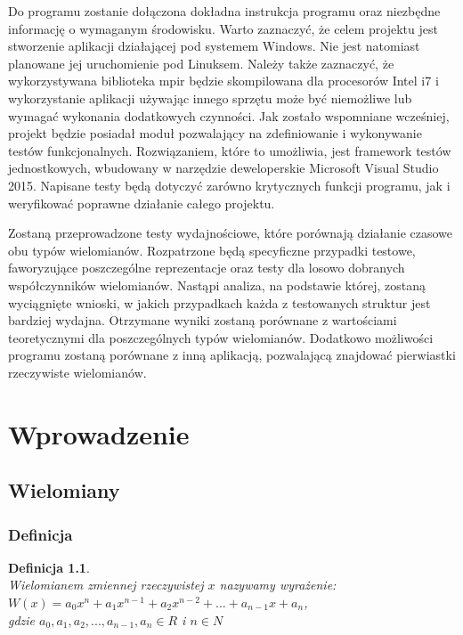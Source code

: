 \documentclass[oneside,a4paper]{book}
\newtheorem{definition}{Definicja}
\begin{document}
	Do programu zostanie dołączona dokładna instrukcja programu oraz niezbędne informację o wymaganym środowisku. Warto zaznaczyć, że celem projektu jest stworzenie aplikacji działającej pod systemem Windows. Nie jest natomiast planowane jej uruchomienie pod Linuksem. Należy także zaznaczyć, że wykorzystywana biblioteka mpir będzie skompilowana dla procesorów Intel i7 i wykorzystanie aplikacji używając innego sprzętu może być niemożliwe lub wymagać wykonania dodatkowych czynności.
	Jak zostało wspomniane wcześniej, projekt będzie posiadał moduł pozwalający na zdefiniowanie i wykonywanie testów funkcjonalnych. Rozwiązaniem, które to umożliwia, jest framework testów jednostkowych, wbudowany w narzędzie deweloperskie Microsoft Visual Studio 2015. Napisane testy będą dotyczyć zarówno krytycznych funkcji programu, jak i weryfikować poprawne działanie całego projektu.
	
	Zostaną przeprowadzone testy wydajnościowe, które porównają działanie czasowe obu typów wielomianów. Rozpatrzone będą specyficzne przypadki testowe, faworyzujące poszczególne reprezentacje oraz testy dla losowo dobranych współczynników wielomianów. Nastąpi analiza, na podstawie której, zostaną wyciągnięte wnioski, w jakich przypadkach każda z testowanych struktur jest bardziej wydajna. Otrzymane wyniki zostaną porównane z wartościami teoretycznymi dla poszczególnych typów wielomianów. Dodatkowo możliwości programu zostaną porównane z inną aplikacją, pozwalającą znajdować pierwiastki rzeczywiste wielomianów.
	
	\chapter{Wprowadzenie}
	\section{Wielomiany}
	\subsection{Definicja}
	
	\begin{definition}
		$ $\\
		Wielomianem zmiennej rzeczywistej $x$ nazywamy wyrażenie: \\
		$W(x) = a_0x^n + a_1x^{n-1} + a_2x^{n-2}+ ... + a_{n-1}x + a_n$, \\
		gdzie $a_0, a_1, a_2, ..., a_{n-1}, a_n\in R$ i $n \in N$
	\end{definition}
	
\end{document}
